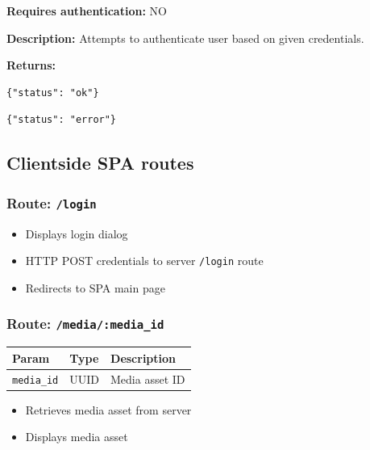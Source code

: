 \documentclass[letterpaper, 9pt, onecolumn, twoside, technote, final]{IEEEtran}
\begin{document}
\textbf{Requires authentication:} NO

\textbf{Description:}
Attempts to authenticate user based on given credentials.

\textbf{Returns:}
\lstset{language=javascript,label= ,caption= ,captionpos=b,numbers=none}
\begin{lstlisting}
{"status": "ok"}
\end{lstlisting}
\lstset{language=javascript,label= ,caption= ,captionpos=b,numbers=none}
\begin{lstlisting}
{"status": "error"}
\end{lstlisting}

\subsection{Clientside SPA routes}
\label{sec:orgd6c1b58}
\subsubsection{Route: \texttt{/login}}
\label{sec:org7a23cb9}

\begin{itemize}
\item Displays login dialog
\item HTTP POST credentials to server \texttt{/login} route
\item Redirects to SPA main page
\end{itemize}

\subsubsection{Route: \texttt{/media/:media\_id}}
\label{sec:orgdf93c4c}

\begin{center}
\begin{tabular}{lll}
\textbf{Param} & \textbf{Type} & \textbf{Description}\\
\hline
\texttt{media\_id} & UUID & Media asset ID\\
\end{tabular}
\end{center}

\begin{itemize}
\item Retrieves media asset from server
\item Displays media asset
\end{itemize}
\end{document}
